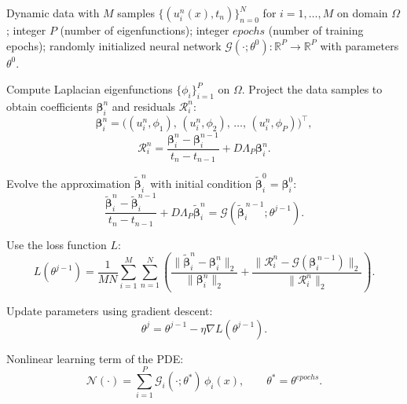 \documentclass[preprint,12pt]{elsarticle}
\theoremstyle{plain}
\numberwithin{figure}{section}
\numberwithin{table}{section}
\newcommand{\jd}[1]{{\color{black}#1}}
\begin{document}
\begin{algorithm}[!htbp]
	\caption{Nonlinear Term Learning for PDE Solving}
	\label{alg:no}
    \jd{
	\begin{algorithmic}[1]
		\Require 
        Dynamic data with $M$ samples $\{(u_i^n(x), t_n)\}_{n=0}^N$ for $i=1,\dots,M$ on domain $\Omega$;  
        integer $P$ (number of eigenfunctions);  
        integer $epochs$ (number of training epochs);  
        randomly initialized neural network $\mathcal{G}(\cdot;\theta^0):\mathbb{R}^P \to \mathbb{R}^P$ with parameters $\theta^0$.  


		\State Compute Laplacian eigenfunctions $\{\phi_i\}_{i=1}^P$ on $\Omega$.  
        \State Project the data samples to obtain coefficients $\bm{\beta}_i^n$ and residuals $\mathcal{R}_i^n$:  
        \[
        \bm{\beta}_i^n = \big( (u_i^n,\phi_1),\,(u_i^n,\phi_2),\,\dots,\,(u_i^n,\phi_P) \big)^\top,
        \]
        \[
        \mathcal{R}_i^n = \frac{\bm{\beta}_i^n - \bm{\beta}_i^{n-1}}{t_n - t_{n-1}} + D \Lambda_P \bm{\beta}_i^n.
        \]

		
        \For{$j$=$1,2,\cdots,epochs$}
		\For{$n = 1, 2, \ldots, N$}
		\State Evolve the approximation $\widetilde{\bm{\beta}}_i^n$ with initial condition $\widetilde{\bm{\beta}}_i^0 = \bm{\beta}_i^0$:  
            \[
            \frac{\widetilde{\bm{\beta}}_i^n - \widetilde{\bm{\beta}}_i^{n-1}}{t_n - t_{n-1}} 
            + D\Lambda_P \widetilde{\bm{\beta}}_i^n
            = \mathcal{G}(\widetilde{\bm{\beta}}_i^{\,n-1}; \theta^{j-1}).
            \]
        \EndFor
        
		\State Use the loss function $L$:  
        \[
        L(\theta^{j-1}) = \frac{1}{MN}\sum_{i=1}^M\sum_{n=1}^N 
        \left( 
        \frac{\|\widetilde{\bm{\beta}}_i^n - \bm{\beta}_i^n\|_{2}}{\|\bm{\beta}_i^n\|_{2}}
        + \frac{\|\mathcal{R}_i^n - \mathcal{G}(\bm{\beta}_i^{\,n-1})\|_{2}}{\|\mathcal{R}_i^n\|_{2}}
        \right).
        \]

        \State Update parameters using gradient descent:  
        \[
        \theta^j = \theta^{j-1} - \eta \nabla L(\theta^{j-1}).
        \]
        \EndFor

		\Ensure Nonlinear learning term of the PDE:  
    \[
    \mathcal{N}(\cdot) = \sum_{i=1}^P \mathcal{G}_i(\cdot;\theta^*) \, \phi_i(x), 
    \qquad \theta^* = \theta^{epochs}.
    \]
        
	\end{algorithmic}}
\end{algorithm}
\end{document}
